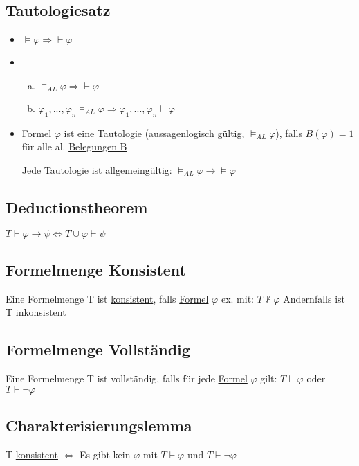 \documentclass[12pt,a4paper]{article} %
\begin{document}
	\subsection{Tautologiesatz}
	\begin{itemize}
		\item $\hyperref[Erfullbar]{\vDash} \varphi \Rightarrow \hyperref[Beweisbar]{\vdash} \varphi$
		\item \begin{enumerate}[(a)]
			\item $\vDash_{AL} \varphi \Rightarrow \hyperref[Beweisbar]{\vdash} \varphi$ 
			\item $\varphi_1, ..., \varphi_n \vDash_{AL} \varphi \Rightarrow \varphi_1, ..., \varphi_n \hyperref[Beweisbar]{\vdash} \varphi$
		\end{enumerate}
		\item \hyperref[Formel]{Formel} $\varphi$ ist eine Tautologie (aussagenlogisch gültig, $\hyperref[Erfullbar]{\vDash_{AL}} \varphi$), falls $B(\varphi) = 1$ für alle al. \hyperref[Belegung]{Belegungen B}
		
		Jede Tautologie ist allgemeingültig: $\hyperref[Erfullbar]{\vDash_{AL}} \varphi \rightarrow \hyperref[Erfullbar]{\vDash} \varphi$
	\end{itemize}
	
	\subsection{Deductionstheorem}
	$T \hyperref[Beweisbar]{\vdash} \varphi \rightarrow \psi \Leftrightarrow T \cup \varphi \hyperref[Beweisbar]{\vdash} \psi$
	
	\subsection{Formelmenge Konsistent}
	Eine Formelmenge T ist \hyperref[ALKonsistent]{konsistent}, falls \hyperref[Formel]{Formel} $\varphi$ ex. mit: $T \nvdash \varphi$ Andernfalls ist T inkonsistent
	
	\subsection{Formelmenge Vollständig}
	Eine Formelmenge T ist vollständig, falls für jede \hyperref[Formel]{Formel} $\varphi$ gilt: $T \hyperref[Beweisbar]{\vdash} \varphi$ oder $T \hyperref[Beweisbar]{\vdash} \neg \varphi$
	
	\subsection{Charakterisierungslemma}
	T \hyperref[ALKonsistent]{konsistent} $\Leftrightarrow$ Es gibt kein $\varphi$ mit $T \hyperref[Beweisbar]{\vdash} \varphi$ und $T \hyperref[Beweisbar]{\vdash} \neg \varphi$
	
\end{document}
